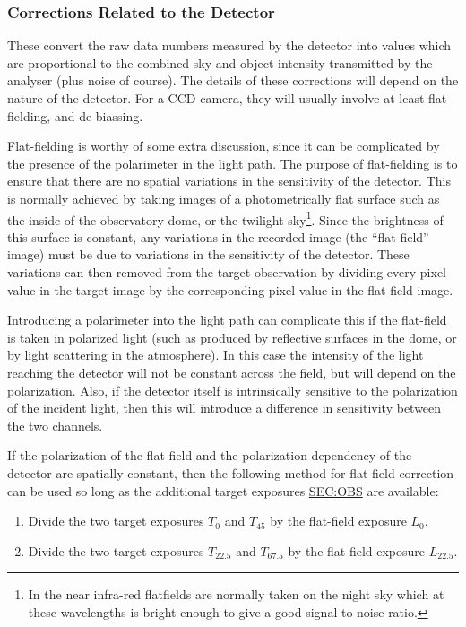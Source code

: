 \subsubsection{\label{SEC:DETCOR}Corrections Related to the Detector}
These convert the raw data numbers measured by the detector into values
which are proportional to the combined sky and object intensity
transmitted by the analyser (plus noise of course). The details of these
corrections will depend on the nature of the detector. For a CCD camera,
they will usually involve at least flat-fielding, and de-biassing. 

Flat-fielding is worthy of some extra discussion, since it can be
complicated by the presence of the polarimeter in the light path. The
purpose of flat-fielding is to ensure that there are no spatial
variations in the sensitivity of the detector. This is normally achieved
by taking images of a photometrically flat surface such as the inside of
the observatory dome, or the twilight sky\footnote{In the near infra-red
flatfields are normally taken on the night sky which at these wavelengths
is bright enough to give a good signal to noise ratio.}. Since the
brightness of this surface is constant, any variations in the recorded
image (the ``flat-field'' image) must be due to variations in the
sensitivity of the detector. These variations can then removed from the
target observation by dividing every pixel value in the target image by
the corresponding pixel value in the flat-field image.

Introducing a polarimeter into the light path can complicate this if the
flat-field is taken in polarized light (such as produced by reflective
surfaces in the dome, or by light scattering in the atmosphere). In this
case the intensity of the light reaching the detector will not be
constant across the field, but will depend on the polarization. Also, if
the detector itself is intrinsically sensitive to the polarization of
the incident light, then this will introduce a difference in sensitivity
between the two channels.

If the polarization of the flat-field and the polarization-dependency 
of the detector are spatially constant, then the following method for
flat-field correction can be used so long as the additional target
exposures \hyperref{$T_{45}$ and $T_{67.5}$}{$T_{45}$ and $T_{67.5}$ 
(see section }{)}{SEC:OBS} are available:

\begin{enumerate}

\item Divide the two target exposures $T_{0}$ and $T_{45}$ by the flat-field
exposure $L_{0}$.

\item Divide the two target exposures $T_{22.5}$ and $T_{67.5}$ by the 
flat-field exposure $L_{22.5}$.

\end{enumerate}

